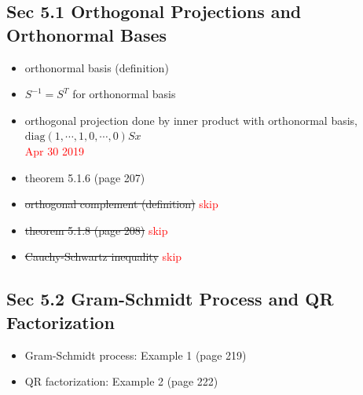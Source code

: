 \documentclass[12pt,a4paper]{article}
\newcommand{\red}[1]{\textcolor{red}{#1}}
\begin{document}
\subsection*{Sec 5.1 Orthogonal Projections and Orthonormal Bases}
\begin{itemize}
    \item orthonormal basis (definition)
    \item $S^{-1} = S^T$ for orthonormal basis
    \item orthogonal projection done by inner product with orthonormal basis, $\mbox{diag}(1, \cdots, 1, 0, \cdots, 0)Sx$
\red{\\Apr 30 2019}
    \item theorem 5.1.6 (page 207)
    \item \st{orthogonal complement (definition)} \red{skip}
    \item \st{theorem 5.1.8 (page 208)} \red{skip}
    \item \st{Cauchy-Schwartz inequality} \red{skip}
\end{itemize}

\subsection*{Sec 5.2 Gram-Schmidt Process and QR Factorization}
\begin{itemize}
    \item Gram-Schmidt process: Example 1 (page 219)
    \item QR factorization: Example 2 (page 222)
\end{itemize}
\end{document}

